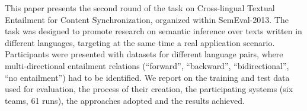 This paper presents the second round of the task on Cross-lingual Textual Entailment for Content Synchronization, organized within SemEval-2013. The task
 was designed to promote research on semantic inference over texts written in
 different languages, targeting at the same time a real application scenario.
 Participants were presented with datasets for different language pairs, where
 multi-directional entailment relations (``forward'', ``backward'',
 ``bidirectional'', ``no entailment'') had to be identified. We report on
 the training and test data used for evaluation, the process of their creation,
 the participating systems (six teams, 61 runs), the approaches adopted and the
 results achieved.

